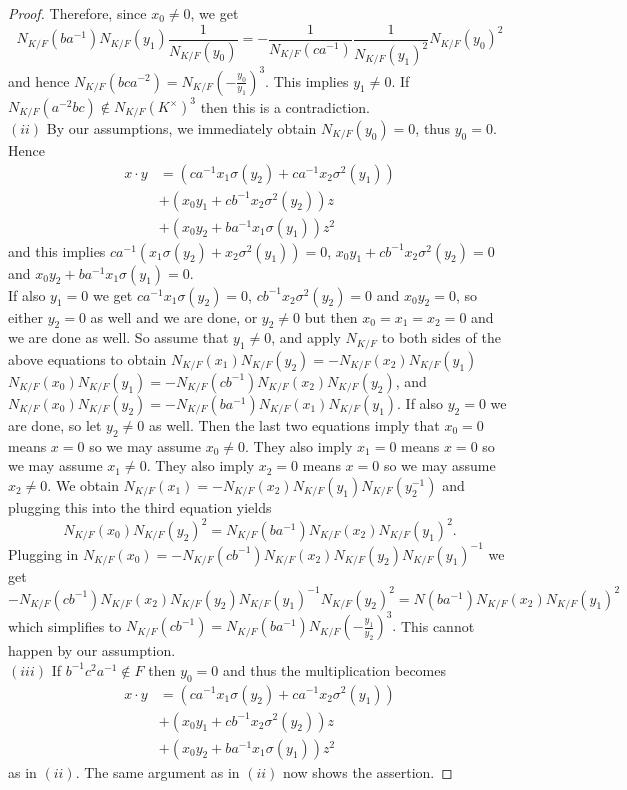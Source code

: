 \documentclass[11pt]{amsart}
\theoremstyle{plain}
\theoremstyle{definition}
\begin{document}
\begin{proof}
Therefore, since $x_0\not=0$, we get
$$N_{K/F}(ba^{-1})N_{K/F}(y_1)\frac{1}{N_{K/F}(y_0)} =- \frac{1}{N_{K/F}(ca^{-1})}\frac{1}{N_{K/F}(y_1)^2} N_{K/F}(y_0)^2$$
and hence
$N_{K/F}(bca^{-2}) = N_{K/F}(-\frac{y_0}{y_1})^3.$
This implies $y_1\not=0$.
If $N_{K/F}(a^{-2} bc)\not\in N_{K/F}(K^\times)^3$ then this is a contradiction.
\\ $(ii) $ By our assumptions, we immediately obtain $N_{K/F}(y_0)=0$, thus $y_0=0$. Hence
\begin{align*}
x\cdot y &= (ca^{-1} x_1 \sigma(y_2) + ca^{-1}x_2 \sigma^2(y_1))\\
&+ (x_0y_1 +  cb^{-1}x_2 \sigma^2(y_2))z  \\
&+ (x_0y_2 + ba^{-1}x_1 \sigma(y_1) )z^2
\end{align*}
and this implies $ca^{-1} (x_1 \sigma(y_2) + x_2 \sigma^2(y_1))=0$, $x_0y_1 +  cb^{-1}x_2 \sigma^2(y_2)=0$ and
$x_0y_2 + ba^{-1}x_1 \sigma(y_1) =0$.
\\ If also $y_1=0$ we get $ca^{-1} x_1 \sigma(y_2) =0$, $cb^{-1}x_2 \sigma^2(y_2)=0$ and
$x_0y_2=0$, so either $y_2=0$ as well and we are done, or $y_2\not=0$ but then $x_0=x_1=x_2=0$ and we are done as well.
So assume that $y_1\not=0$, and apply $N_{K/F}$ to both sides of the above equations to obtain
$N_{K/F}(x_1)N_{K/F}(y_2)=- N_{K/F}(x_2)N_{K/F}(y_1)$
$ N_{K/F}(x_0)N_{K/F}(y_1) =- N_{K/F}(cb^{-1})N_{K/F}(x_2 )N_{K/F}(y_2)$, and
$N_{K/F}(x_0)N_{K/F}(y_2) =- N_{K/F}(ba^{-1})N_{K/F}(x_1)N_{K/F}( y_1)$. If also $y_2=0$ we are done, so let $y_2\not=0$ as well. Then the last two equations imply that
$x_0=0$ means $x=0$ so we may assume $x_0\not=0$. They also imply $x_1=0$ means $x=0$ so we may assume $x_1\not=0$.
They also imply $x_2=0$ means $x=0$ so we may assume $x_2\not=0$. We obtain
$N_{K/F}(x_1)=- N_{K/F}(x_2)N_{K/F}(y_1)N_{K/F}(y_2^{-1})$
and plugging this into the third equation yields
$$N_{K/F}(x_0)N_{K/F}(y_2)^2 = N_{K/F}(ba^{-1})N_{K/F}(x_2)N_{K/F}( y_1)^2.$$
Plugging in $ N_{K/F}(x_0) =- N_{K/F}(cb^{-1})N_{K/F}(x_2 )N_{K/F}(y_2)N_{K/F}(y_1)^{-1}$ we get
$$- N_{K/F}(cb^{-1})N_{K/F}(x_2 )N_{K/F}(y_2)N_{K/F}(y_1)^{-1}N_{K/F}(y_2)^2 = N(ba^{-1})N_{K/F}(x_2)N_{K/F}( y_1)^2$$
which simplifies to
$ N_{K/F}(cb^{-1}) = N_{K/F}(ba^{-1})N_{K/F}( -\frac{y_1}{y_2})^3.$
This cannot happen by our assumption.
\\ $(iii)$  If $b^{-1}c^2 a^{-1}\not \in F$ then $y_0=0$ and thus the multiplication becomes
\begin{align*}
x\cdot y &= (ca^{-1} x_1 \sigma(y_2) + ca^{-1}x_2 \sigma^2(y_1))\\
&+ (x_0y_1 +  cb^{-1}x_2 \sigma^2(y_2))z  \\
&+ (x_0y_2 + ba^{-1}x_1 \sigma(y_1) )z^2
\end{align*}
as in $(ii)$. The same argument as in $(ii)$ now shows the assertion.
\end{proof}
\end{document}
